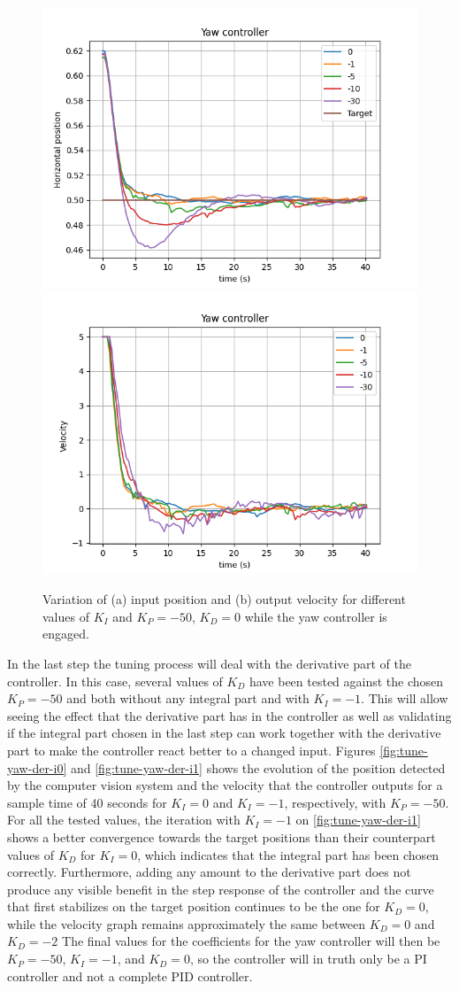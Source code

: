 \begin{figure}
  \centering
  \includegraphics[width=.45\linewidth]{img/pid/yaw/yaw_pos_p50_int_d0.png}
  \includegraphics[width=.45\linewidth]{img/pid/yaw/yaw_vel_p50_int_d0.png}
  \caption{Variation of (a) input position and (b) output velocity for different values of $K_{I}$ and $K_P=-50$, $K_D=0$ while the yaw controller is engaged.}\label{fig:tune-yaw-int-50}
\end{figure}

In the last step the tuning process will deal with the derivative part of the controller.
In this case, several values of $K_D$ have been tested against the chosen $K_P=-50$ and both without any integral part and with $K_I=-1$.
This will allow seeing the effect that the derivative part has in the controller as well as validating if the integral part chosen in the last step can work together with the derivative part to make the controller react better to a changed input.
Figures \ref{fig:tune-yaw-der-i0} and \ref{fig:tune-yaw-der-i1} shows the evolution of the position detected by the computer vision system and the velocity that the controller outputs for a sample time of 40 seconds for $K_I=0$ and $K_I=-1$, respectively, with $K_P=-50$.
For all the tested values, the iteration with $K_I=-1$ on \ref{fig:tune-yaw-der-i1} shows a better convergence towards the target positions than their counterpart values of $K_D$ for $K_I=0$, which indicates that the integral part has been chosen correctly.
Furthermore, adding any amount to the derivative part does not produce any visible benefit in the step response of the controller and the curve that first stabilizes on the target position continues to be the one for $K_D=0$, while the velocity graph remains approximately the same between $K_D=0$ and $K_D=-2$
The final values for the coefficients for the yaw controller will then be $K_P=-50$, $K_I=-1$, and $K_D=0$, so the controller will in truth only be a PI controller and not a complete PID controller.


